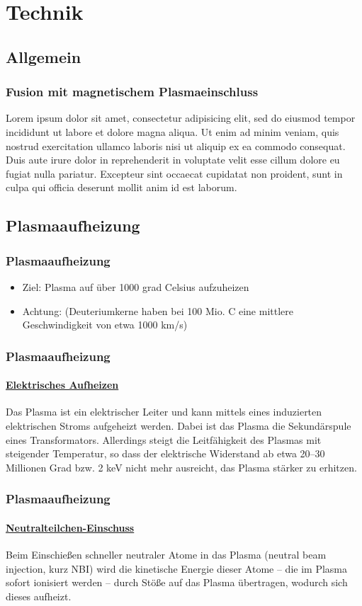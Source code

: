\documentclass[aspectratio=169]{beamer}
\begin{document}
  \section{Technik}
    \subsection{Allgemein}

      \begin{frame}
        \frametitle{Fusion mit magnetischem Plasmaeinschluss}
        Lorem ipsum dolor sit amet, consectetur adipisicing elit, sed do eiusmod tempor incididunt ut labore et dolore magna aliqua. Ut enim ad minim veniam, quis nostrud exercitation ullamco laboris nisi ut aliquip ex ea commodo consequat. Duis aute irure dolor in reprehenderit in voluptate velit esse cillum dolore eu fugiat nulla pariatur. Excepteur sint occaecat cupidatat non proident, sunt in culpa qui officia deserunt mollit anim id est laborum.
      \end{frame}

    \subsection{Plasmaaufheizung}

      \begin{frame}
        \frametitle{Plasmaaufheizung}
        \begin{itemize}
          \item Ziel: Plasma auf über 1000 grad Celsius aufzuheizen
          \pause
          \item Achtung: (Deuteriumkerne haben bei 100 Mio. C eine mittlere
          Geschwindigkeit von etwa 1000 km/s)
        \end{itemize}
      \end{frame}

      \begin{frame}
        \frametitle{Plasmaaufheizung}
        \framesubtitle{\underline{Elektrisches Aufheizen}}
        Das Plasma ist ein elektrischer Leiter und kann mittels eines induzierten elektrischen Stroms aufgeheizt werden. Dabei ist das Plasma die Sekundärspule eines Transformators. Allerdings steigt die Leitfähigkeit des Plasmas mit steigender Temperatur, so dass der elektrische Widerstand ab etwa 20–30 Millionen Grad bzw. 2 keV nicht mehr ausreicht, das Plasma stärker zu erhitzen.
      \end{frame}

      \begin{frame}
        \frametitle{Plasmaaufheizung}
        \framesubtitle{\underline{Neutralteilchen-Einschuss}}
        Beim Einschießen schneller neutraler Atome in das Plasma (neutral beam injection, kurz NBI) wird die kinetische Energie dieser Atome – die im Plasma sofort ionisiert werden – durch Stöße auf das Plasma übertragen, wodurch sich dieses aufheizt.
      \end{frame}
\end{document}
